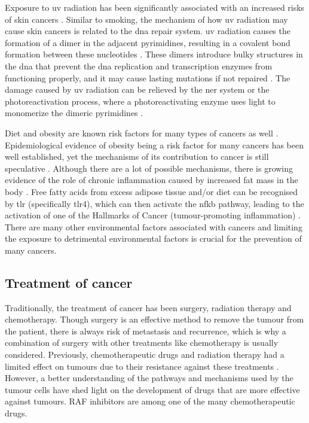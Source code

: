 Exposure to \gls{uv} radiation has been significantly associated with an increased risks of skin cancers \citep{Armstrong2001,Gallagher2006}.
Similar to smoking, the mechanism of how \gls{uv} radiation may cause  skin cancers is related to the \acrshort{dna} repair system.
\gls{uv} radiation causes the formation of a dimer in the adjacent pyrimidines, resulting in a covalent bond formation between these nucleotides \citep{Friedberg2003,Hoeijmakers2001}.
These dimers introduce bulky structures in the \acrshort{dna} that prevent the \acrshort{dna} replication and transcription enzymes from functioning properly, and it may cause lasting mutations if not repaired \citep{Friedberg2003,Hoeijmakers2001}.
The damage caused by \gls{uv} radiation can be relieved by the \gls{ner} system or the photoreactivation process, where a photoreactivating enzyme uses light to monomerize the dimeric pyrimidines \citep{Friedberg2003}.

Diet and obesity are known risk factors for many types of cancers as well \citep{Ames1995,Calle2004}.
Epidemiological evidence of obesity being a risk factor for many cancers has been well established, yet the mechanisms of its contribution to cancer is still  speculative \citep{Calle2003,Kelesidis2006}.
Although there are a lot of possible mechanisms, there is growing evidence of the role of chronic inflammation caused by increased fat mass in the body \citep{Kelesidis2006,Lumeng2011,Hernandez2013}.
Free fatty acids from excess adipose tissue and/or diet can be recognised by \gls{tlr} (specifically \gls{tlr}4), which can then activate the \gls{nfkb} pathway, leading to the activation of one of the Hallmarks of Cancer (tumour-promoting inflammation) \citep{Lumeng2011}.
There are many other environmental factors associated with cancers and limiting the exposure to detrimental environmental factors is crucial for the prevention of many cancers.

\subsection{Treatment of cancer}
\label{sub:treatment_of_cancer}

Traditionally, the treatment of cancer has been surgery, radiation therapy and chemotherapy.
Though surgery is an effective method to remove the tumour from the patient, there is always risk of metastasis and recurrence, which is why a combination of surgery with other treatments like chemotherapy is usually considered.
Previously, chemotherapeutic drugs and radiation therapy had a limited effect on tumours due to their resistance against these treatments \citep{Wilhelm2006}.
However, a better understanding of the pathways and mechanisms used by the tumour cells have shed  light on the development of drugs that are more effective against tumours.
RAF inhibitors are among one of the many chemotherapeutic drugs.

